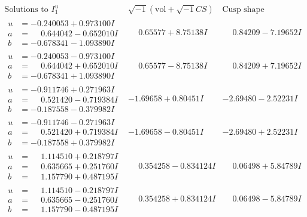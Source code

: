 \documentclass[1p]{elsarticle_modified}
\theoremstyle{definition}
\newcommand{\I}{\sqrt{-1}}
\begin{document}
$$\begin{array}{c|c|c}  
\text{Solutions to }I^u_{1}& \I (\text{vol} + \sqrt{-1}CS) & \text{Cusp shape}\\
 \hline 
\begin{aligned}
u &= -0.240053 + 0.973100 I \\
a &= \phantom{-}0.644042 - 0.652010 I \\
b &= -0.678341 - 1.093890 I\end{aligned}
 & \phantom{-}0.65577 + 8.75138 I & \phantom{-}0.84209 - 7.19652 I \\ \hline\begin{aligned}
u &= -0.240053 - 0.973100 I \\
a &= \phantom{-}0.644042 + 0.652010 I \\
b &= -0.678341 + 1.093890 I\end{aligned}
 & \phantom{-}0.65577 - 8.75138 I & \phantom{-}0.84209 + 7.19652 I \\ \hline\begin{aligned}
u &= -0.911746 + 0.271963 I \\
a &= \phantom{-}0.521420 - 0.719384 I \\
b &= -0.187558 - 0.379982 I\end{aligned}
 & -1.69658 + 0.80451 I & -2.69480 - 2.52231 I \\ \hline\begin{aligned}
u &= -0.911746 - 0.271963 I \\
a &= \phantom{-}0.521420 + 0.719384 I \\
b &= -0.187558 + 0.379982 I\end{aligned}
 & -1.69658 - 0.80451 I & -2.69480 + 2.52231 I \\ \hline\begin{aligned}
u &= \phantom{-}1.114510 + 0.218797 I \\
a &= \phantom{-}0.635665 + 0.251760 I \\
b &= \phantom{-}1.157790 + 0.487195 I\end{aligned}
 & \phantom{-}0.354258 - 0.834124 I & \phantom{-}0.06498 + 5.84789 I \\ \hline\begin{aligned}
u &= \phantom{-}1.114510 - 0.218797 I \\
a &= \phantom{-}0.635665 - 0.251760 I \\
b &= \phantom{-}1.157790 - 0.487195 I\end{aligned}
 & \phantom{-}0.354258 + 0.834124 I & \phantom{-}0.06498 - 5.84789 I \\ \hline\begin{aligned}

\end{aligned}
\end{array}$$
\end{document}
